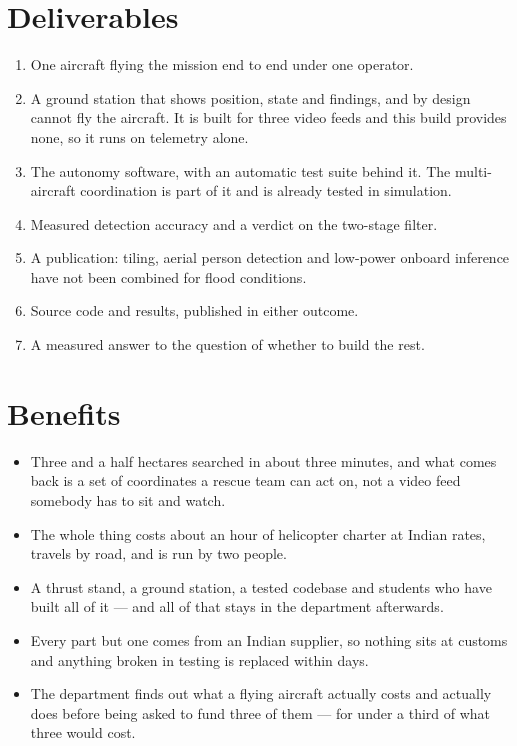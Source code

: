 \documentclass[11pt,a4paper]{article}
\begin{document}
\section{Deliverables}

\begin{enumerate}\itemsep0pt
\item One aircraft flying the mission end to end under one operator.
\item A ground station that shows position, state and findings, and by design
cannot fly the aircraft. It is built for three video feeds and this build
provides none, so it runs on telemetry alone.
\item The autonomy software, with an automatic test suite behind it. The
multi-aircraft coordination is part of it and is already tested in simulation.
\item Measured detection accuracy and a verdict on the two-stage filter.
\item A publication: tiling, aerial person detection and low-power onboard
inference have not been combined for flood conditions.
\item Source code and results, published in either outcome.
\item A measured answer to the question of whether to build the rest.
\end{enumerate}

\section{Benefits}

\begin{itemize}\itemsep2pt
\item Three and a half hectares searched in about three minutes, and what comes
back is a set of coordinates a rescue team can act on, not a video feed
somebody has to sit and watch.
\item The whole thing costs about an hour of helicopter charter at Indian
rates, travels by road, and is run by two people.
\item A thrust stand, a ground station, a tested codebase and students who have
built all of it --- and all of that stays in the department afterwards.
\item Every part but one comes from an Indian supplier, so nothing sits at
customs and anything broken in testing is replaced within days.
\item The department finds out what a flying aircraft actually costs and
actually does before being asked to fund three of them --- for under a third of
what three would cost.
\end{itemize}
\end{document}
